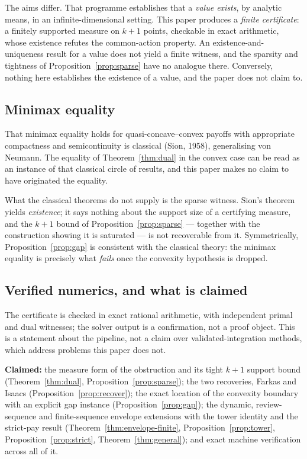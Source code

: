 \documentclass[10pt,twocolumn]{article}
\theoremstyle{definition}
\begin{document}
The aims differ. That programme establishes that a \emph{value exists}, by analytic means, in
an infinite-dimensional setting. This paper produces a \emph{finite certificate}: a
finitely supported measure on $k+1$ points, checkable in exact arithmetic, whose existence
refutes the common-action property. An existence-and-uniqueness result for a value does not
yield a finite witness, and the sparsity and tightness of
Proposition~\ref{prop:sparse} have no analogue there. Conversely, nothing here establishes
the existence of a value, and the paper does not claim to.

\subsection{Minimax equality}

That minimax equality holds for quasi-concave--convex payoffs with appropriate compactness
and semicontinuity is classical (Sion, 1958), generalising von Neumann. The equality of
Theorem~\ref{thm:dual} in the convex case can be read as an instance of that classical
circle of results, and this paper makes no claim to have originated the equality.

What the classical theorems do not supply is the sparse witness. Sion's theorem yields
\emph{existence}; it says nothing about the support size of a certifying measure, and the
$k+1$ bound of Proposition~\ref{prop:sparse} --- together with the construction showing it is
saturated --- is not recoverable from it. Symmetrically, Proposition~\ref{prop:gap} is
consistent with the classical theory: the minimax equality is precisely what
\emph{fails} once the convexity hypothesis is dropped.

\subsection{Verified numerics, and what is claimed}

The certificate is checked in exact rational arithmetic, with independent primal and dual
witnesses; the solver output is a confirmation, not a proof object. This is a statement about
the pipeline, not a claim over validated-integration methods, which address problems this
paper does not.

\medskip

\noindent \textbf{Claimed:} the measure form of the obstruction and its tight $k+1$ support
bound (Theorem~\ref{thm:dual}, Proposition~\ref{prop:sparse}); the two recoveries, Farkas and
Isaacs (Proposition~\ref{prop:recover}); the exact location of the convexity boundary with an
explicit gap instance (Proposition~\ref{prop:gap}); the dynamic, review-sequence and
finite-sequence envelope extensions with the tower identity and the strict-pay result
(Theorem~\ref{thm:envelope-finite}, Proposition~\ref{prop:tower},
Proposition~\ref{prop:strict}, Theorem~\ref{thm:general}); and exact machine verification
across all of it.
\end{document}
